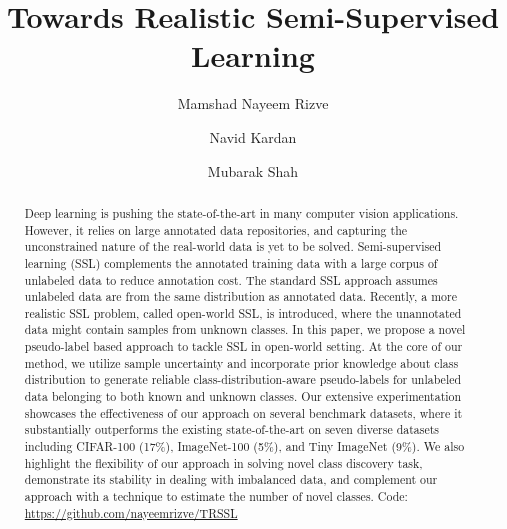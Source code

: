 \documentclass[runningheads]{eccv2022submission}
\begin{document}
\pagestyle{headings}
\mainmatter
\def\ECCVSubNumber{7402}  





\title{Towards Realistic Semi-Supervised Learning} \begin{comment}
\titlerunning{ECCV-22 submission ID \ECCVSubNumber} 
\authorrunning{ECCV-22 submission ID \ECCVSubNumber} 
\author{Anonymous ECCV submission}
\institute{Paper ID \ECCVSubNumber}
\end{comment}


\author{Mamshad Nayeem Rizve \and
Navid Kardan \and
Mubarak Shah}
\maketitle

\begin{abstract}
Deep learning is pushing the state-of-the-art in many computer vision applications. However, it relies on large annotated data repositories, and capturing the unconstrained nature of the real-world data is yet to be solved. Semi-supervised learning (SSL) complements the annotated training data with a large corpus of unlabeled data to reduce annotation cost. The standard SSL approach assumes unlabeled data are from the same distribution as annotated data.  
Recently, a more realistic SSL problem, called open-world SSL, is introduced, where the unannotated data might contain samples from unknown classes. In this paper, we propose a novel pseudo-label based approach to tackle SSL in open-world setting. At the core of our method, we utilize sample uncertainty and incorporate prior knowledge about class distribution to generate reliable class-distribution-aware pseudo-labels for unlabeled data belonging to both known and unknown classes. Our extensive experimentation showcases the effectiveness of our approach on several benchmark datasets, where it substantially outperforms the existing state-of-the-art on seven diverse datasets including CIFAR-100 (17\%), ImageNet-100 (5\%), and Tiny ImageNet (9\%). We also highlight the flexibility of our approach in solving novel class discovery task, demonstrate its stability in dealing with imbalanced data, and complement our approach with a technique to estimate the number of novel classes. Code: \url{https://github.com/nayeemrizve/TRSSL}
\end{abstract}
\end{document}
